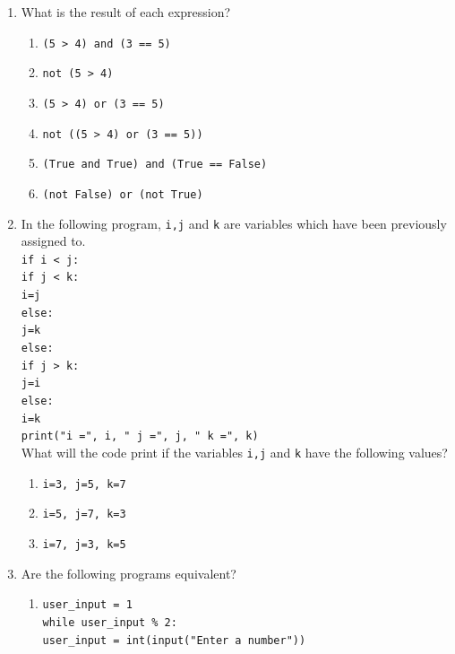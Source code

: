 \documentclass{article}
\begin{document}
\begin{enumerate}
\item What is the result of each expression?\\
\begin{enumerate}
	\item \texttt{(5 > 4) and (3 == 5)}
	\item \texttt{not (5 > 4) }
	\item \texttt{(5 > 4) or (3 == 5)}
	\item \texttt{not ((5 > 4) or (3 == 5))}
	\item \texttt{(True and True) and (True == False)}
	\item \texttt{(not False) or (not True)}
\end{enumerate}
\item In the following program, \texttt{i,j} and \texttt{k} are variables which have been previously assigned to. \\
\texttt{if  i < j:}\\
\null\quad\texttt{if j < k:}\\
\null\quad\quad\texttt{i=j}\\
\null\quad\texttt{else:}\\
\null\quad\quad\texttt{j=k}\\
\texttt{else:}\\
\null\quad\texttt{if j > k:}\\
\null\quad\quad\texttt{j=i}\\
\null\quad\texttt{else:}\\
\null\quad\quad\texttt{i=k}\\
\texttt{print("i =", i, " j =", j, " k =", k)}\\
What will the code print if the variables \texttt{i,j} and \texttt{k} have the following values?
\begin{enumerate}
	\item \texttt{i=3, j=5, k=7}
	\item \texttt{i=5, j=7, k=3}
	\item \texttt{i=7, j=3, k=5}
\end{enumerate}
\item Are the following programs equivalent?
\begin{multicols}{2}
\begin{enumerate}
	\item \texttt{user\_input = 1}\\
	\texttt{while user\_input \% 2:}\\
		\null\quad\texttt{user\_input = int(input("Enter a number"))}\\

\end{enumerate}
\end{multicols}
\end{enumerate}
\end{document}

